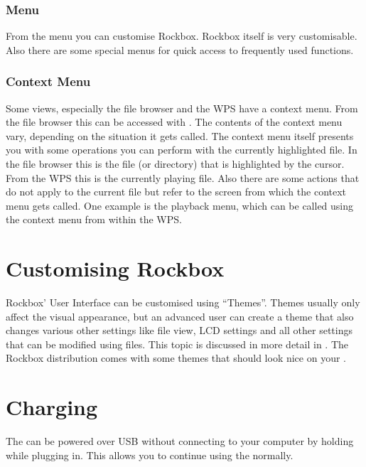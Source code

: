 \subsubsection{Menu}
From the menu you can customise Rockbox. Rockbox itself is very customisable.
Also there are some special menus for quick access to frequently used
functions.

\subsubsection{Context Menu}
Some views, especially the file browser and the WPS have a context menu.
From the file browser this can be accessed with \ActionStdContext{}.
The contents of the context menu vary, depending on the situation it gets
called. The context menu itself presents you with some operations you can
perform with the currently highlighted file. In the file browser this is
the file (or directory) that is highlighted by the cursor. From the WPS this is
the currently playing file. Also there are some actions that do not apply
to the current file but refer to the screen from which the context menu
gets called. One example is the playback menu, which can be called using
the context menu from within the WPS.

\section{Customising Rockbox}
Rockbox' User Interface can be customised using ``Themes''. Themes usually
only affect the visual appearance, but an advanced user can create a theme
that also changes various other settings like file view, LCD settings and
all other settings that can be modified using  files. This topic
is discussed in more detail in .
The Rockbox distribution comes with some themes that should look nice on
your \dap{}. 

{
  {
     \section{Charging}
     The \dap{} can be powered over USB without connecting to your computer by holding \ActionStdUsbCharge{} while plugging in. This allows you to continue using the \dap{} normally.
  }
}



